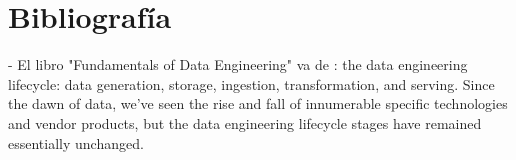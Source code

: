 \documentclass[12pt]{book}
\begin{document}
\chapter{Bibliografía}
- El libro "Fundamentals of Data Engineering" va de : the data engineering lifecycle: data generation, storage, ingestion, transformation, and serving. Since the dawn of data, we've seen the rise and fall of innumerable specific technologies and vendor products, but the data engineering lifecycle stages have remained essentially unchanged. 
\end{document}
